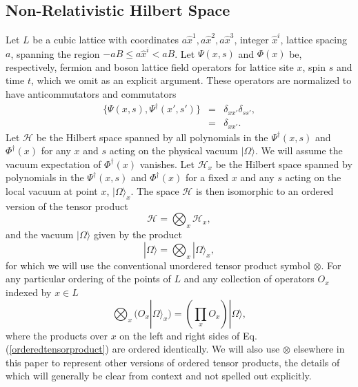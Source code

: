 \documentclass[12pt,amsmath,amssymb,onecolumn]{revtex4-2}
\begin{document}
\subsection{\label{subsec:hilbertspace} Non-Relativistic Hilbert Space}


Let $L$ be a cubic lattice with coordinates $a\hat{x}^1, a\hat{x}^2, a\hat{x}^3$, integer $\hat{x}^i$, lattice spacing $a$, 
spanning the region $-aB \leq a\hat{x}^i < aB$.
Let $\Psi( x, s)$ and $\Phi( x)$ be, respectively, fermion and
boson lattice field operators for lattice site $x$, spin $s$ and time $t$,
which we omit as an explicit argument.
These operators are normalized to have anticommutators and commutators
\begin{subequations}
\begin{eqnarray}
  \label{normpsi}
  \{ \Psi( x, s), \Psi^{\dagger}( x', s') \} &=& \delta_{xx'} \delta_{ss'}, \\
    \label{normphi}
[ \Phi( x), \Phi^{\dagger}( x')] &=& \delta_{xx'}.
\end{eqnarray}
\end{subequations}
Let $\mathcal{H}$ be the Hilbert space spanned by all polynomials in
the $\Psi^{\dagger}( x, s)$ and $\Phi^{\dagger}( x)$ for any $x$ and $s$ acting on the physical vacuum $|\Omega \rangle $.
We will assume the vacuum expectation of $\Phi^{\dagger}(x)$ vanishes.
Let $\mathcal{H}_x$ be the Hilbert space spanned by polynomials in 
the $\Psi^{\dagger}( x, s)$ and $\Phi^{\dagger}( x)$ for a fixed $x$ and any $s$ acting on  the local
vacuum at point $x$, $|\Omega \rangle _x$.
The space $\mathcal{H}$ is then isomorphic to an ordered version of the tensor product
\begin{equation}\label{tensorproduct}
\mathcal{H} = \bigotimes_x \mathcal{H}_x,
\end{equation}
and the vacuum $|\Omega \rangle $ given by the product
\begin{equation}\label{tensorproductvacuum}
|\Omega \rangle  = \bigotimes_x |\Omega \rangle _x,
\end{equation}
for which we will use the conventional unordered tensor product symbol $\otimes$.
For any particular ordering of the points of $L$ and any collection of
operators $O_x$ indexed by $x \in L$
\begin{equation}\label{orderedtensorproduct}
  \bigotimes_x (O_x |\Omega \rangle _x) = (\prod_x O_x) |\Omega \rangle ,
\end{equation}
where the products over $x$ on the left and right sides of Eq. (\ref{orderedtensorproduct})
are ordered identically.
We will also use $\otimes$ elsewhere in this paper to represent other versions of ordered
tensor products, the details of which will generally be clear from context and not
spelled out explicitly.
\end{document}
